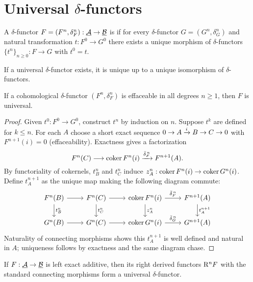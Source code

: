 \section{Universal \texorpdfstring{\( \delta \)}{delta}-functors}

\begin{definition*}
	A \( \delta \)-functor \( F=(F^n,\delta_F^n): \underline{\mathcal A} \to \underline{\mathcal B} \) is  if for every \( \delta \)-functor \( G=(G^n,\delta_G^n) \) and natural transformation \( t: F^0 \to G^0 \) there exists a unique morphism of \( \delta \)-functors \( \{t^n\}_{n\ge 0}: F \to G \) with \( t^0 = t \).
\end{definition*}

\begin{lemma*}
	If a universal \( \delta \)-functor exists, it is unique up to a unique isomorphism of \( \delta \)-functors.
\end{lemma*}

\begin{theorem*}
	If a cohomological \( \delta \)-functor \( (F^n, \delta_F^n) \) is effaceable in all degrees \( n\ge 1 \), then \( F \) is universal.
\end{theorem*}

\begin{proof}
	Given \( t^0: F^0 \to G^0 \), construct \( t^{n} \) by induction on \( n \). Suppose \( t^k \) are defined for \( k\le n \). For each \( A \) choose a short exact sequence \( 0\to A \xrightarrow{i} B \to C \to 0 \) with \( F^{n+1}(i)=0 \) (effaceability). Exactness gives a factorization
	\[
		F^n(C) \longrightarrow \operatorname{coker} F^n(i) \xrightarrow{\bar\delta_F^{\,n}} F^{n+1}(A).
	\]
	By functoriality of cokernels, \( t^n_B \) and \( t^n_C \) induce \( z_A^{n}: \operatorname{coker} F^n(i) \to \operatorname{coker} G^n(i) \). Define \( t_A^{n+1} \) as the unique map making the following diagram commute:
	\[
		\begin{tikzcd}
			F^n(B) \arrow[r] \arrow[d,"t_B^n"] & F^n(C) \arrow[r] \arrow[d,"t_C^n"] & \coker F^n(i) \arrow[r,"\bar\delta_F^{\,n}"] \arrow[d,"z_A^{n}"] & F^{n+1}(A) \arrow[d,"t_A^{n+1}"] \\
			G^n(B) \arrow[r] & G^n(C) \arrow[r] & \coker G^n(i) \arrow[r,"\bar\delta_G^{\,n}"] & G^{n+1}(A)
		\end{tikzcd}
	\]
	Naturality of connecting morphisms shows this \( t_A^{n+1} \) is well defined and natural in \( A \); uniqueness follows by exactness and the same diagram chase.
\end{proof}

\begin{corollary*}
	If \( F: \underline{\mathcal A} \to \underline{\mathcal B} \) is left exact additive, then its right derived functors \( \mathrm R^nF \) with the standard connecting morphisms form a universal \( \delta \)-functor.
\end{corollary*}

